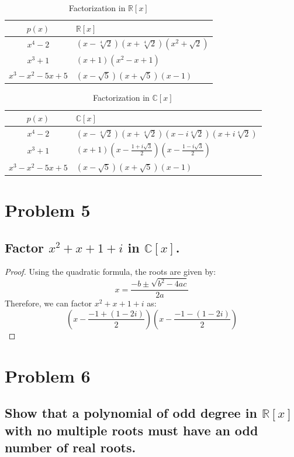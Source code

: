 \documentclass{article}
\begin{document}
\begin{table}[h]
    \centering
    \begin{tabular}{c|p{6cm}}
        $p(x)$ & $\mathbb{R}[x]$ \\
        \hline
        $x^4-2$ & $(x-\sqrt[4]{2})(x+\sqrt[4]{2})(x^2+\sqrt{2})$ \\
        $x^3+1$ & $(x+1)(x^2-x+1)$ \\
        $x^3-x^2-5x+5$ & $(x-\sqrt{5})(x+\sqrt{5})(x-1)$ \\
    \end{tabular}
    \caption{Factorization in $\mathbb{R}[x]$}
\end{table}

\begin{table}[h]
    \centering
    \begin{tabular}{c|p{6cm}}
        $p(x)$ & $\mathbb{C}[x]$ \\
        \hline
        $x^4-2$ & $(x-\sqrt[4]{2})(x+\sqrt[4]{2})(x-i\sqrt[4]{2})(x+i\sqrt[4]{2})$ \\
        $x^3+1$ & $(x+1)(x-\frac{1+i\sqrt{3}}{2})(x-\frac{1-i\sqrt{3}}{2})$ \\
        $x^3-x^2-5x+5$ & $(x-\sqrt{5})(x+\sqrt{5})(x-1)$ \\
    \end{tabular}
    \caption{Factorization in $\mathbb{C}[x]$}
\end{table}

\section{Problem 5}
\subsection{Factor $x^2+x+1+i$ in $\mathbb{C}[x]$.}

\begin{proof}
    Using the quadratic formula, the roots are given by:
    \[
        x = \frac{-b \pm \sqrt{b^2-4ac}}{2a}
    \]
    Therefore, we can factor $x^2+x+1+i$ as:
    \[
        \left(x-\frac{-1+(1-2i)}{2}\right)\left(x-\frac{-1-(1-2i)}{2}\right)
    \]
\end{proof}

\section{Problem 6}
\subsection{Show that a polynomial of odd degree in $\mathbb{R}[x]$ with no multiple roots must have an odd number of real roots.}
\end{document}

